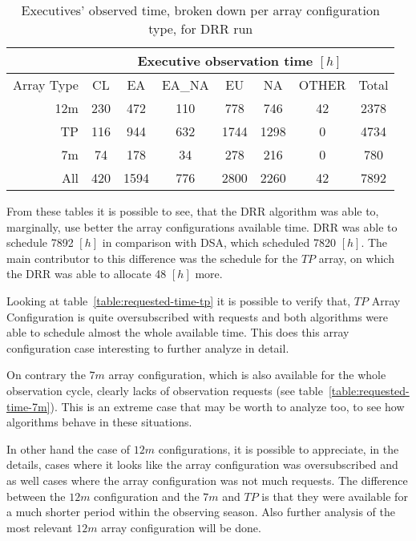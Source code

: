 \begin{table}[t]
\centering
\begin{tabular}{c|c|c|c|c|c|c|c|} 
\cline{2-8}
 & \multicolumn{7}{c|}{Executive observation time $[h]$} \\ \hline
 \multicolumn{1}{|r|}{Array Type} & CL	& EA & EA\_NA &	EU & NA & OTHER & Total \\ \hline
 \multicolumn{1}{|r|}{12m} &	230 & 	472 &	110 &	778 & 	746 &	42 & 2378 \\ \hline
 \multicolumn{1}{|r|}{TP} & 116 & 944 & 632 &	1744 &	1298 & 	0 &	4734 \\ \hline
 \multicolumn{1}{|r|}{7m} & 74	& 178 & 34 & 278 & 216 & 0 & 780 \\ \hline
 \multicolumn{1}{|r|}{All} & 420 & 1594 & 776 & 2800 & 2260 & 42 & 7892 \\ \hline
\end{tabular}
\caption{Executives' observed time, broken down per array configuration type, for DRR run}
\label{table:drr-hours-per-array}
\end{table}

From these tables it is possible to see, that the DRR algorithm was able to, marginally, use better the array configurations available time. DRR was able to schedule 7892 $[h]$ in comparison with DSA, which scheduled 7820 $[h]$. The main contributor to this difference was the schedule for the $TP$ array, on which the DRR was able to allocate 48 $[h]$ more. 

Looking at table~\ref{table:requested-time-tp} it is possible to verify that, $TP$ Array Configuration is quite oversubscribed with requests and both algorithms were able to schedule almost the whole available time. This does this array configuration case interesting to further analyze in detail. 

On contrary the $7m$ array configuration, which is also available for the whole observation cycle, clearly lacks of observation requests (see table~\ref{table:requested-time-7m}). This is an extreme case that may be worth to analyze too, to see how algorithms behave in these situations.

In other hand the case of $12m$ configurations, it is possible to appreciate, in the details, cases where it looks like the array configuration was oversubscribed and as well cases where the array configuration was not much requests. The difference between the $12m$ configuration and the $7m$ and $TP$ is that they were available for a much shorter period within the observing season. Also further analysis of the most relevant $12m$ array configuration will be done.

